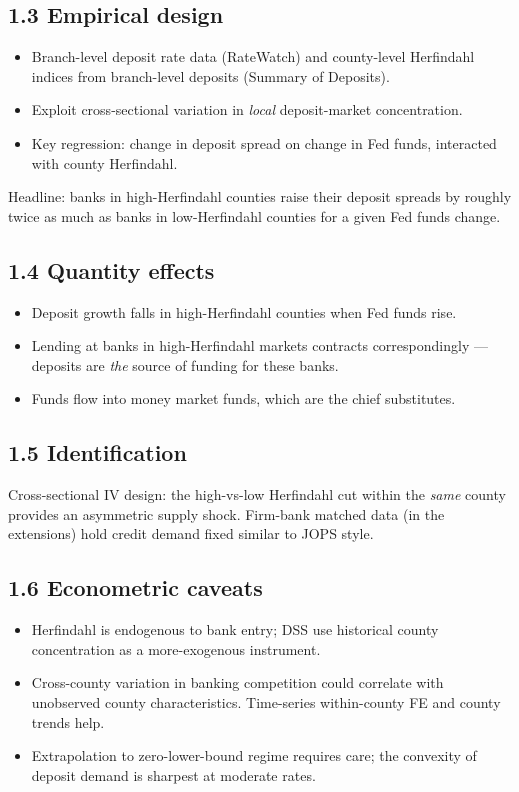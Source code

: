\documentclass[11pt]{article}
\begin{document}
\subsection*{1.3 Empirical design}
\begin{itemize}
\item Branch-level deposit rate data (RateWatch) and county-level Herfindahl indices from branch-level deposits (Summary of Deposits).
\item Exploit cross-sectional variation in \emph{local} deposit-market concentration.
\item Key regression: change in deposit spread on change in Fed funds, interacted with county Herfindahl.
\end{itemize}
Headline: banks in high-Herfindahl counties raise their deposit spreads by roughly twice as much as banks in low-Herfindahl counties for a given Fed funds change.

\subsection*{1.4 Quantity effects}
\begin{itemize}
\item Deposit growth falls in high-Herfindahl counties when Fed funds rise.
\item Lending at banks in high-Herfindahl markets contracts correspondingly --- deposits are \emph{the} source of funding for these banks.
\item Funds flow into money market funds, which are the chief substitutes.
\end{itemize}

\subsection*{1.5 Identification}
Cross-sectional IV design: the high-vs-low Herfindahl cut within the \emph{same} county provides an asymmetric supply shock. Firm-bank matched data (in the extensions) hold credit demand fixed similar to JOPS style.

\subsection*{1.6 Econometric caveats}
\begin{alertbox}
\begin{itemize}
\item Herfindahl is endogenous to bank entry; DSS use historical county concentration as a more-exogenous instrument.
\item Cross-county variation in banking competition could correlate with unobserved county characteristics. Time-series within-county FE and county trends help.
\item Extrapolation to zero-lower-bound regime requires care; the convexity of deposit demand is sharpest at moderate rates.
\end{itemize}
\end{alertbox}
\end{document}
